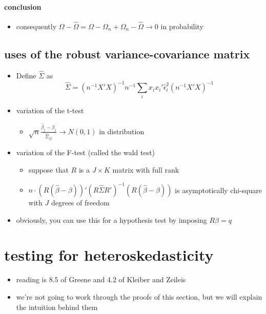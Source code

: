 \paragraph{conclusion}
\label{sec-1-2-2-3}

\begin{itemize}
\item consequently $\Omega - \hat\Omega = \Omega - \Omega_n +
         \Omega_n - \hat\Omega \to 0$ in probability
\end{itemize}
\subsection{uses of the robust variance-covariance matrix}
\label{sec-1-3}

\begin{itemize}
\item Define $\hat\Sigma$ as 
       \[\hat\Sigma = (n^{-1} X'X)^{-1} n^{-1} \sum_i x_i x_i' \hat\epsilon_i^2 (n^{-1} X'X)^{-1}\]
\item variation of the t-test
\begin{itemize}
\item $\sqrt{n} \frac{\hat\beta_j - \beta_j}{\hat\Sigma_{jj}} \to
         N(0,1)$ in distribution
\end{itemize}
\item variation of the F-test (called the wald test)
\begin{itemize}
\item suppose that $R$ is a $J \times K$ matrix with full rank
\item $n \cdot (R(\hat\beta - \beta))'(R\hat\Sigma R')^{-1}
         (R(\hat\beta - \beta))$ is asymptotically chi-square with $J$
         degrees of freedom
\end{itemize}
\item obviously, you can use this for a hypothesis test by imposing
       $R\beta  = q$
\end{itemize}
\section{testing for heteroskedasticity}
\label{sec-2}

\begin{itemize}
\item reading is 8.5 of Greene and 4.2 of Kleiber and Zeileis
\item we're not going to work through the proofs of this section, but
      we will explain the intuition behind them
\end{itemize}
